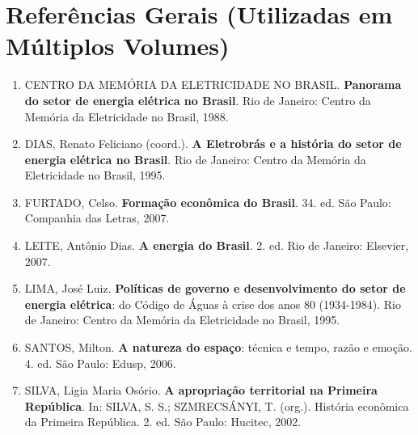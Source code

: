 \documentclass[12pt,a4paper]{report}
\begin{document}
\chapter*{Referências Gerais (Utilizadas em Múltiplos Volumes)}

\begin{enumerate}[leftmargin=*]
    \item CENTRO DA MEMÓRIA DA ELETRICIDADE NO BRASIL. \textbf{Panorama do setor de energia elétrica no Brasil}. Rio de Janeiro: Centro da Memória da Eletricidade no Brasil, 1988.
    
    \item DIAS, Renato Feliciano (coord.). \textbf{A Eletrobrás e a história do setor de energia elétrica no Brasil}. Rio de Janeiro: Centro da Memória da Eletricidade no Brasil, 1995.
    
    \item FURTADO, Celso. \textbf{Formação econômica do Brasil}. 34. ed. São Paulo: Companhia das Letras, 2007.
    
    \item LEITE, Antônio Dias. \textbf{A energia do Brasil}. 2. ed. Rio de Janeiro: Elsevier, 2007.
    
    \item LIMA, José Luiz. \textbf{Políticas de governo e desenvolvimento do setor de energia elétrica}: do Código de Águas à crise dos anos 80 (1934-1984). Rio de Janeiro: Centro da Memória da Eletricidade no Brasil, 1995.
    
    \item SANTOS, Milton. \textbf{A natureza do espaço}: técnica e tempo, razão e emoção. 4. ed. São Paulo: Edusp, 2006.
    
    \item SILVA, Ligia Maria Osório. \textbf{A apropriação territorial na Primeira República}. In: SILVA, S. S.; SZMRECSÁNYI, T. (org.). História econômica da Primeira República. 2. ed. São Paulo: Hucitec, 2002.
\end{enumerate}
\end{document}

